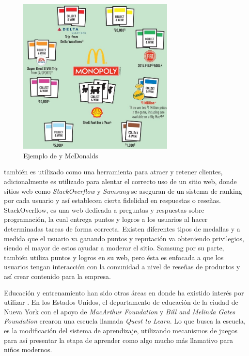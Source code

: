 \begin{figure}[!htb]
  \centering
  \includegraphics[width=0.7\textwidth]{images/Gam_mcdonalds.jpg}
  \caption[Mcdonalds y {\gam}]{Ejemplo de {\gam} y McDonalds}
  \label{fig:mcdonalds}
\end{figure}



{\GAM} también es utilizado como una herramienta para atraer y retener clientes,
adicionalmente es utilizado para alentar el correcto uso de un sitio web,
donde sitios web como \emph{StackOverflow} \cite{StackOverflow}y \emph{Samsung} se aseguran de un sistema
de ranking por cada usuario y así establecen cierta fidelidad en respuestas
o reseñas.
StackOverflow, es una web dedicada a preguntas y respuestas sobre programación,
la cual entrega puntos  y logros a los usuarios al hacer determinadas tareas
de forma correcta.
Existen diferentes tipos de medallas y a medida que el usuario va ganando
puntos y reputación va obteniendo privilegios, siendo el mayor de estos ayudar a
moderar el sitio.
Samsung por su parte, también utiliza puntos y logros en su web, pero ésta
es enfocada a que los usuarios tengan interacción con la comunidad a nivel de
reseñas de productos y así crear contenido para la empresa\cite{Gam:Util:3}.

Educación y entrenamiento han sido otras áreas en donde ha existido interés por
utilizar {\gam}.
En los Estados Unidos, el departamento de educación de la ciudad de Nueva York
con el apoyo de \emph{MacArthur Foundation} y \emph{Bill and Melinda Gates
Foundation} crearon una escuela  llamada \emph{Quest to Learn}.
Lo que busca la escuela, es la modificación del sistema de aprendizaje,
utilizando mecanismos de juegos para así presentar la etapa de aprender
como algo mucho más llamativo para niños modernos\cite{Gam:Util:4}.

